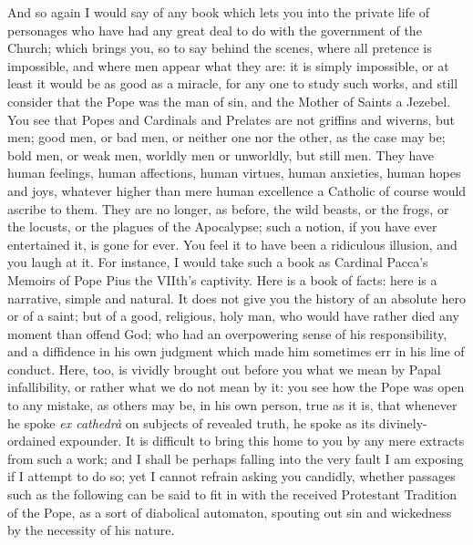 And so again I would say of any book which lets you
into the private life of personages who have had any
great deal to do with the government of the Church; which
brings you, so to say behind the scenes, where all
pretence is impossible, and where men appear what they
are: it is simply impossible, or at least it would be as
good as a miracle, for any one to study such works, and
still consider that the Pope was the man of sin, and the
Mother of Saints a Jezebel. You see that Popes and
Cardinals and Prelates are not griffins and wiverns, but
men; good men, or bad men, or neither one nor the other,
as the case may be; bold men, or weak men, worldly men or
unworldly, but still men. They have human feelings, human
affections, human virtues, human anxieties, human hopes
and joys, whatever higher than mere human excellence a
Catholic of course would ascribe to them. They are no
longer, as before, the wild beasts, or the frogs, or the
locusts, or the plagues of the Apocalypse; such a notion,
if you have ever entertained it, is gone for ever. You
feel it to have been a ridiculous illusion, and you laugh
at it. For instance, I would take such a book as Cardinal
Pacca's Memoirs of Pope Pius the VIIth's captivity. Here
is a book of facts: here is a narrative, simple and
natural. It does not give you the history of an absolute
hero or of a saint; but of a good, religious, holy man,
who would have rather died any moment than offend God;
who had an overpowering sense of his responsibility, and
a diffidence in his own judgment which made him sometimes
err in his line of conduct. Here, too, is vividly brought
out before you what we mean by Papal infallibility, or
rather what we do not mean by it: you see how the Pope
was open to any mistake, as others may be, in his own
person, true as it is, that whenever he spoke \emph{ex
cathedrà} on subjects of revealed truth, he spoke as
its divinely-ordained expounder. It is difficult to bring
this home to you by any mere extracts from such a work;
and I shall be perhaps falling into the very fault I am
exposing if I attempt to do so; yet I cannot refrain
asking you candidly, whether passages such as the
following can be said to fit in with the received
Protestant Tradition of the Pope, as a sort of diabolical
automaton, spouting out sin and wickedness by the
necessity of his nature.

